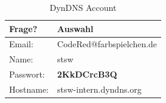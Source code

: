 \begin{table}[htbp]
\begin{center}
\begin{tabular*}{0.95\textwidth}{p{}p{}}
\hline
\textbf{Frage?} & \textbf{Auswahl} \\
\hline
Email: & CodeRed@farbspielchen.de \\
Name: & stsw \\
Passwort: & \textbf{2KkDCrcB3Q} \\
Hostname: & stsw-intern.dyndns.org \\
\hline
\end{tabular*}
\caption{DynDNS Account}
\label{table:DynDNS Account}
\end{center}
\end{table}

